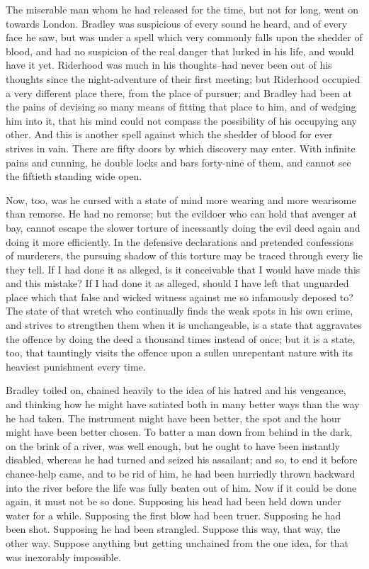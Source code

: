 The miserable man whom he had released for the time, but not for long,
went on towards London. Bradley was suspicious of every sound he heard,
and of every face he saw, but was under a spell which very commonly
falls upon the shedder of blood, and had no suspicion of the real danger
that lurked in his life, and would have it yet. Riderhood was much
in his thoughts--had never been out of his thoughts since the
night-adventure of their first meeting; but Riderhood occupied a very
different place there, from the place of pursuer; and Bradley had been
at the pains of devising so many means of fitting that place to him, and
of wedging him into it, that his mind could not compass the possibility
of his occupying any other. And this is another spell against which
the shedder of blood for ever strives in vain. There are fifty doors by
which discovery may enter. With infinite pains and cunning, he double
locks and bars forty-nine of them, and cannot see the fiftieth standing
wide open.

Now, too, was he cursed with a state of mind more wearing and more
wearisome than remorse. He had no remorse; but the evildoer who can hold
that avenger at bay, cannot escape the slower torture of incessantly
doing the evil deed again and doing it more efficiently. In the
defensive declarations and pretended confessions of murderers, the
pursuing shadow of this torture may be traced through every lie they
tell. If I had done it as alleged, is it conceivable that I would have
made this and this mistake? If I had done it as alleged, should I have
left that unguarded place which that false and wicked witness against me
so infamously deposed to? The state of that wretch who continually finds
the weak spots in his own crime, and strives to strengthen them when
it is unchangeable, is a state that aggravates the offence by doing
the deed a thousand times instead of once; but it is a state, too, that
tauntingly visits the offence upon a sullen unrepentant nature with its
heaviest punishment every time.

Bradley toiled on, chained heavily to the idea of his hatred and his
vengeance, and thinking how he might have satiated both in many better
ways than the way he had taken. The instrument might have been better,
the spot and the hour might have been better chosen. To batter a man
down from behind in the dark, on the brink of a river, was well enough,
but he ought to have been instantly disabled, whereas he had turned and
seized his assailant; and so, to end it before chance-help came, and
to be rid of him, he had been hurriedly thrown backward into the river
before the life was fully beaten out of him. Now if it could be done
again, it must not be so done. Supposing his head had been held down
under water for a while. Supposing the first blow had been truer.
Supposing he had been shot. Supposing he had been strangled. Suppose
this way, that way, the other way. Suppose anything but getting
unchained from the one idea, for that was inexorably impossible.

